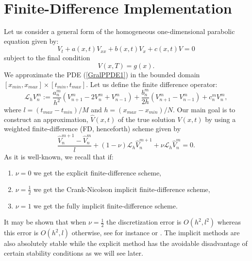 \section{Finite-Difference Implementation}
Let us consider a general form of the homogeneous one-dimensional parabolic
equation given by:
\begin{equation}
\label{GralPPDE1}
V_t+a(x,t)V_{xx}+b(x,t)V_x+c(x,t) V=0
\end{equation}
subject to the final condition
\begin{equation}
\label{FBC}
V(x,T)=g(x).
\end{equation}
We approximate the PDE (\ref{GralPPDE1}) in the bounded domain $[ 
x_{min}, x_{max}] \times [t_{min}, t_{max}]$. Let us define the
finite difference operator:
$$
\mathcal{L}_h V^m_n:=\frac{a^m_n}{h^2} (V^m_{n+1}-2V^m_n +
V^m_{n-1})+\frac{b^m_n}{2h} (V^m_{n+1}-V^m_{n-1}) + c^m_n V^m_n,
$$
where $l=(t_{max}-t_{min})/M$ and $h= (x_{max}-x_{min})/N$.
Our main goal is to construct an approximation, $\widehat{V}(x,t)$ of the
true solution $V(x,t)$ by using a weighted finite-difference (FD,
henceforth) scheme given by   
\begin{equation}
\label{gralweightedFD1}
\frac{\widehat{V}^{m+1}_n-\widehat{V}^m_n}{l}+(1-\nu) \mathcal{L}_h \widehat{V}^{m+1}_n+\nu\mathcal{L}_h \widehat{V}^m_n=0.
\end{equation}
As it is well-known, we recall that if:
\begin{enumerate}
\item $\nu =0$ we get the explicit finite-difference scheme,
\item $\nu =\frac{1}{2} $ we get the Crank-Nicolson implicit
  finite-difference scheme,
\item $\nu= 1$ we get the fully implicit finite-difference scheme.
\end{enumerate}
It may be shown that when $\nu = \frac{1}{2}$ the discretization error
is $O(h^2, l^2)$ whereas this error is $O(h^2, l)$ otherwise, see for instance
\cite[Chap. 8, pp. 139--156]{DHW:1995} or \cite[Chap. 2, pp. 39 and
93]{S:1985}. The implicit methods are also absolutely stable while the
explicit method has the avoidable disadvantage of certain stability
conditions as we will see later.

